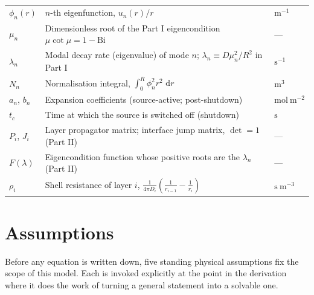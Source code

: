 \documentclass[11pt,a4paper]{article}
\newcommand{\Bi}{\mathrm{Bi}}
\newcommand{\dd}{\,\mathrm{d}}
\begin{document}
\begin{center}
\begin{tabular}{@{}lp{9.3cm}l@{}}
$\phi_n(r)$    & $n$-th eigenfunction, $u_n(r)/r$                      & $\mathrm{m^{-1}}$ \\
$\mu_n$        & Dimensionless root of the Part I eigencondition $\mu\cot\mu=1-\Bi$ & --- \\
$\lambda_n$    & Modal decay rate (eigenvalue) of mode $n$; $\lambda_n\equiv D\mu_n^2/R^2$ in Part I & $\mathrm{s^{-1}}$ \\
$N_n$          & Normalisation integral, $\int_0^R \phi_n^2 r^2\,\dd r$ & $\mathrm{m^{3}}$ \\
$a_n$, $b_n$   & Expansion coefficients (source-active; post-shutdown) & $\mathrm{mol\ m^{-2}}$ \\
$t_c$          & Time at which the source is switched off (shutdown)   & $\mathrm{s}$ \\
$P_i$, $J_i$   & Layer propagator matrix; interface jump matrix, $\det=1$ (Part II) & --- \\
$F(\lambda)$   & Eigencondition function whose positive roots are the $\lambda_n$ (Part II) & --- \\
$\rho_i$       & Shell resistance of layer $i$, $\frac{1}{4\pi D_i}\left(\frac1{r_{i-1}}-\frac1{r_i}\right)$ & $\mathrm{s\ m^{-3}}$ \\
\bottomrule
\end{tabular}
\end{center}
\clearpage

\section*{Assumptions}

Before any equation is written down, five standing physical assumptions fix
the scope of this model. Each is invoked explicitly at the point in the
derivation where it does the work of turning a general statement into a
solvable one.
\end{document}
